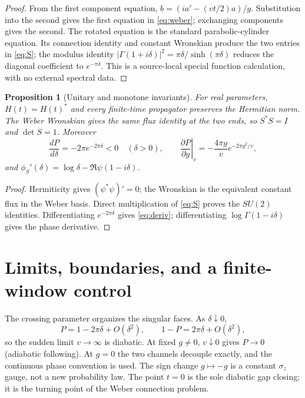 \documentclass[10pt]{article}
\newtheorem{proposition}{Proposition}
\begin{document}
\begin{proof}
From the first component equation,
$b=(ia'-(vt/2)a)/g$.  Substitution into the second gives the first equation
in \eqref{eq:weber}; exchanging components gives the second.  The rotated
equation is the standard parabolic-cylinder equation.  Its connection identity
and constant Wronskian produce the two entries in \eqref{eq:S}; the modulus
identity $|\Gamma(1+i\delta)|^2=\pi\delta/\sinh(\pi\delta)$ reduces the
diagonal coefficient to $e^{-\pi\delta}$.  This is a source-local special
function calculation, with no external spectral data.
\end{proof}

\begin{proposition}[Unitary and monotone invariants]\label{prop:inv}
For real parameters, $H(t)=H(t)^*$ and every finite-time propagator preserves
the Hermitian norm.  The Weber Wronskian gives the same flux identity at the
two ends, so $S^*S=I$ and $\det S=1$.  Moreover
\begin{equation}
 \frac{dP}{d\delta}=-2\pi e^{-2\pi\delta}<0\quad(\delta>0),\qquad
 \left.\frac{\partial P}{\partial g}\right|_v=-\frac{4\pi g}{v}e^{-2\pi g^2/v},
 \label{eq:deriv}
\end{equation}
and $\phi_S'(\delta)=\log\delta-\Re\psi(1-i\delta)$.
\end{proposition}

\begin{proof}
Hermiticity gives $(\psi^*\psi)'=0$; the Wronskian is the equivalent
constant flux in the Weber basis.  Direct multiplication of \eqref{eq:S}
proves the $SU(2)$ identities.  Differentiating $e^{-2\pi\delta}$ gives
\eqref{eq:deriv}; differentiating $\log\Gamma(1-i\delta)$ gives the phase
derivative.
\end{proof}

\clearpage
\section{Limits, boundaries, and a finite-window control}

The crossing parameter organizes the singular faces.  As $\delta\downarrow0$,
\begin{equation}
 P=1-2\pi\delta+O(\delta^2),\qquad 1-P=2\pi\delta+O(\delta^2),
\end{equation}
so the sudden limit $v\to\infty$ is diabatic.  At fixed $g\ne0$, $v\downarrow0$
gives $P\to0$ (adiabatic following).  At $g=0$ the two channels decouple
exactly, and the continuous phase convention is used.  The sign change
$g\mapsto-g$ is a constant $\sigma_z$ gauge, not a new probability law.  The
point $t=0$ is the sole diabatic gap closing; it is the turning point of the
Weber connection problem.
\end{document}
